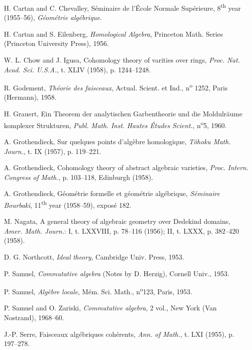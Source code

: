 
\label{bib-section}

\begin{thebibliography}{22}
H. Cartan and C. Chevalley,
S\'eminaire de l'\'Ecole Normale Sup\'erieure,
8\textsuperscript{th} year (1955--56),
\emph{G\'eom\'etrie alg\'ebrique}.

H. Cartan and S. Eilenberg,
\emph{Homological Algebra},
Princeton Math. Series (Princeton University Press),
1956.

W. L. Chow and J. Igusa,
Cohomology theory of varities over rings,
\emph{Proc. Nat. Acad. Sci. U.S.A.},
t. XLIV (1958),
p. 1244--1248.

R. Godement,
\emph{Th\'eorie des faisceaux},
Actual. Scient. et Ind.,
n\textsuperscript{o} 1252,
Paris (Hermann),
1958.

H. Grauert,
Ein Theorem der analytischen Garbentheorie und die Moldulr\"aume komplexer Strukturen,
\emph{Publ. Math. Inst. Hautes \'Etudes Scient.},
n\textsuperscript{o}5,
1960.

A. Grothendieck,
Sur quelques points d'alg\`ebre homologique,
\emph{T\^ohoku Math. Journ.},
t. IX (1957),
p. 119--221.

A. Grothendieck,
Cohomology theory of abstract algebraic varieties,
\emph{Proc. Intern. Congress of Math.},
p. 103--118,
Edinburgh (1958).

A. Grothendieck,
G\'eom\'etrie formelle et g\'eom\'etrie alg\'ebrique,
\emph{S\'eminaire Bourbaki},
11\textsuperscript{th} year (1958--59),
expos\'e 182.

M. Nagata,
A general theory of algebraic geometry over Dedekind domains,
\emph{Amer. Math. Journ.}:
I,
t. LXXVIII,
p. 78--116 (1956);
II,
t. LXXX,
p. 382--420 (1958).

D. G. Northcott,
\emph{Ideal theory},
Cambridge Univ. Press,
1953.

P. Samuel,
\emph{Commutative algebra} (Notes by D. Herzig),
Cornell Univ.,
1953.

P. Samuel,
\emph{Alg\`ebre locale},
M\'em. Sci. Math.,
n\textsuperscript{o}123,
Paris,
1953.

P. Samuel and O. Zariski,
\emph{Commutative algebra},
2 vol.,
New York (Van Nostrand),
1968--60.

J.-P. Serre,
Faisceaux alg\'ebriques coh\'erents,
\emph{Ann. of Math.},
t. LXI (1955),
p. 197--278.


\end{thebibliography}
